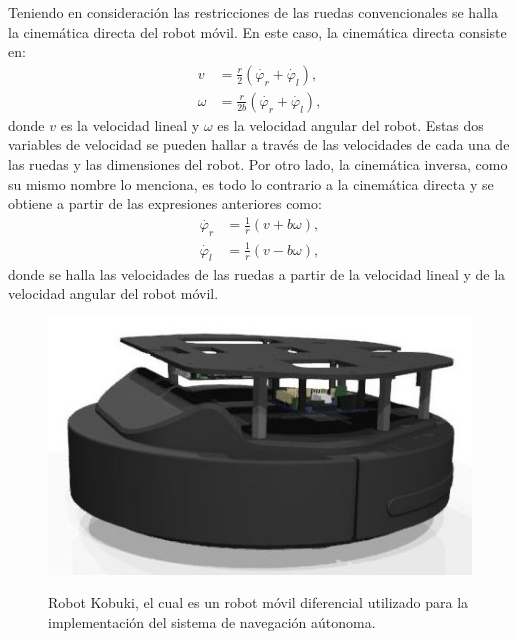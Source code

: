
Teniendo en consideración las restricciones de las ruedas convencionales se halla la 
cinemática directa del robot móvil. En este caso, la cinemática directa consiste en:
\begin{align*}
v &= \frac{r}{2}(\dot{\varphi_{r}} + \dot{\varphi_{l}}), \\
\omega &= \frac{r}{2b}(\dot{\varphi_{r}} + \dot{\varphi_{l}}),
\end{align*}
donde $v$ es la velocidad lineal y $\omega$ es la velocidad angular del robot. Estas 
dos variables de velocidad se pueden hallar a través de las velocidades
de cada una de las ruedas y las dimensiones del robot. Por otro lado, la cinemática 
inversa, como su mismo nombre lo menciona, es todo lo contrario a la
cinemática directa y se obtiene a partir de las expresiones anteriores como: 
\begin{align*}
\dot{\varphi_{r}} &= \frac{1}{r}(v + b\omega), \\
\dot{\varphi_{l}} &= \frac{1}{r}(v - b\omega),
\end{align*}
donde se halla las velocidades de las ruedas a partir de la velocidad lineal y de la
velocidad angular del robot móvil.
\begin{figure}%
 \centering \footnotesize
 {\includegraphics[width=0.35\linewidth]{images/turtlebot.jpg}}
 \captionsetup{font=footnotesize}
 \caption{Robot Kobuki, el cual es un robot móvil diferencial utilizado para la 
 implementación del sistema de navegación aútonoma.}
 \label{fig:kobuki}
 \end{figure}

